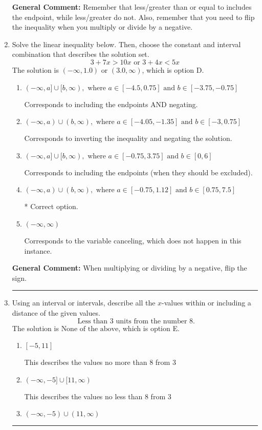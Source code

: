 \documentclass{extbook}[14pt]
\newcommand{\litem}[1]{\item #1

\rule{\textwidth}{0.4pt}}
\begin{document}
\begin{enumerate}
{\textbf{General Comment:} Remember that less/greater than or equal to includes the endpoint, while less/greater do not. Also, remember that you need to flip the inequality when you multiply or divide by a negative.
}
\litem{
Solve the linear inequality below. Then, choose the constant and interval combination that describes the solution set.
\[ 3 + 7 x > 10 x \text{ or } 3 + 4 x < 5 x \]The solution is \( (-\infty, 1.0) \text{ or } (3.0, \infty) \), which is option D.\begin{enumerate}[label=\Alph*.]
\item \( (-\infty, a] \cup [b, \infty), \text{ where } a \in [-4.5, 0.75] \text{ and } b \in [-3.75, -0.75] \)

Corresponds to including the endpoints AND negating.
\item \( (-\infty, a) \cup (b, \infty), \text{ where } a \in [-4.05, -1.35] \text{ and } b \in [-3, 0.75] \)

Corresponds to inverting the inequality and negating the solution.
\item \( (-\infty, a] \cup [b, \infty), \text{ where } a \in [-0.75, 3.75] \text{ and } b \in [0, 6] \)

Corresponds to including the endpoints (when they should be excluded).
\item \( (-\infty, a) \cup (b, \infty), \text{ where } a \in [-0.75, 1.12] \text{ and } b \in [0.75, 7.5] \)

 * Correct option.
\item \( (-\infty, \infty) \)

Corresponds to the variable canceling, which does not happen in this instance.
\end{enumerate}

\textbf{General Comment:} When multiplying or dividing by a negative, flip the sign.
}
\litem{
Using an interval or intervals, describe all the $x$-values within or including a distance of the given values.
\[ \text{ Less than } 3 \text{ units from the number } 8. \]The solution is \( \text{None of the above} \), which is option E.\begin{enumerate}[label=\Alph*.]
\item \( [-5, 11] \)

This describes the values no more than 8 from 3
\item \( (-\infty, -5] \cup [11, \infty) \)

This describes the values no less than 8 from 3
\item \( (-\infty, -5) \cup (11, \infty) \)


\end{enumerate}}
\end{enumerate}
\end{document}
